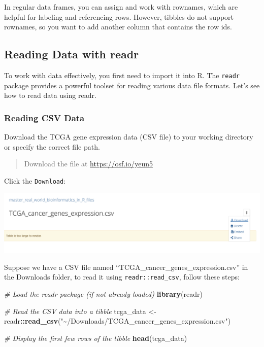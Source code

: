 \documentclass[
]{book}
\newenvironment{Shaded}{\begin{snugshade}}{\end{snugshade}}
\newcommand{\CommentTok}[1]{\textcolor[rgb]{0.56,0.35,0.01}{\textit{#1}}}
\newcommand{\FunctionTok}[1]{\textcolor[rgb]{0.13,0.29,0.53}{\textbf{#1}}}
\newcommand{\NormalTok}[1]{#1}
\newcommand{\OtherTok}[1]{\textcolor[rgb]{0.56,0.35,0.01}{#1}}
\newcommand{\SpecialCharTok}[1]{\textcolor[rgb]{0.81,0.36,0.00}{\textbf{#1}}}
\newcommand{\StringTok}[1]{\textcolor[rgb]{0.31,0.60,0.02}{#1}}
\begin{document}
In regular data frames, you can assign and work with rownames, which are helpful for labeling and referencing rows. However, tibbles do not support rownames, so you want to add another column that contains the row ids.

\hypertarget{reading-data-with-readr}{%
\subsection{Reading Data with readr}\label{reading-data-with-readr}}

To work with data effectively, you first need to import it into R. The \texttt{readr} package provides a powerful toolset for reading various data file formats. Let's see how to read data using readr.

\hypertarget{reading-csv-data}{%
\subsubsection{Reading CSV Data}\label{reading-csv-data}}

Download the TCGA gene expression data (CSV file) to your working directory or specify the correct file path.

\begin{quote}
Download the file at \url{https://osf.io/yeun5}
\end{quote}

Click the \texttt{Download}:

\includegraphics{images/osf.png}

Suppose we have a CSV file named ``TCGA\_cancer\_genes\_expression.csv'' in the Downloads folder, to read it using \texttt{readr::read\_csv}, follow these steps:

\begin{Shaded}
\begin{Highlighting}[]
\CommentTok{\# Load the readr package (if not already loaded)}
\FunctionTok{library}\NormalTok{(readr)}

\CommentTok{\# Read the CSV data into a tibble}
\NormalTok{tcga\_data }\OtherTok{\textless{}{-}}\NormalTok{ readr}\SpecialCharTok{::}\FunctionTok{read\_csv}\NormalTok{(}\StringTok{"\textasciitilde{}/Downloads/TCGA\_cancer\_genes\_expression.csv"}\NormalTok{)}

\CommentTok{\# Display the first few rows of the tibble}
\FunctionTok{head}\NormalTok{(tcga\_data)}
\end{Highlighting}
\end{Shaded}
\end{document}
